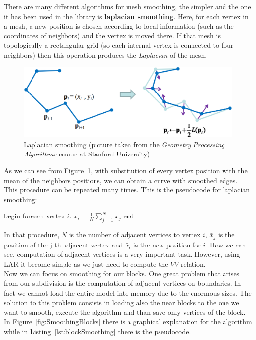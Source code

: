 There are many different algorithms for mesh smoothing, the simpler and the one it has been used in the library is \textbf{laplacian smoothing}. Here, for each vertex in a mesh, a new position is chosen according to local information (such as the coordinates of neighbors) and the vertex is moved there. If that mesh is topologically a rectangular grid (so each internal vertex is connected to four neighbors) then this operation produces the \textit{Laplacian} of the mesh.
\begin{figure}[htb] %
   \centering
   \includegraphics[width=0.60\linewidth]{images/LaplacianSmoothing.png}
   \caption[Laplacian smoothing]{Laplacian smoothing (picture taken from the \textit{Geometry Processing Algorithms} course at Stanford University)}
   \label{fig:laplacianSmoothing}
\end{figure}

As we can see from Figure~\ref{fig:laplacianSmoothing}, with substitution of every vertex position with the mean of the neighbors positions, we can obtain a curve with smoothed edges. This procedure can be repeated many times. This is the pseudocode for laplacian smoothing:

\begin{pseudo}[caption={Laplacian smoothing}, label={lst:laplacianSmoothing}]
begin
  foreach vertex $i$:
    $\bar{x}_{i}= \displaystyle\frac{1}{N} \displaystyle\sum_{j=1}^{N}\bar{x}_j$
end
\end{pseudo}

In that procedure, $N$ is the number of adjacent vertices to vertex $i$, $\bar{x}_{j}$ is the position of the j-th adjacent vertex and $\bar{x}_{i}$ is the new position for $i$. How we can see, computation of adjacent vertices is a very important task. However, using LAR it become simple as we just need to compute the $VV$ relation.\\

Now we can focus on smoothing for our blocks. One great problem that arises from our subdivision is the computation of adjacent vertices on boundaries. In fact we cannot load the entire model into memory due to the enormous sizes. The solution to this problem consists in loading also the near blocks to the one we want to smooth, execute the algorithm and than save only vertices of the block. In Figure~\ref{fig:SmoothingBlocks} there is a graphical explanation for the algorithm while in Listing~\ref{lst:blockSmoothing} there is the pseudocode.

